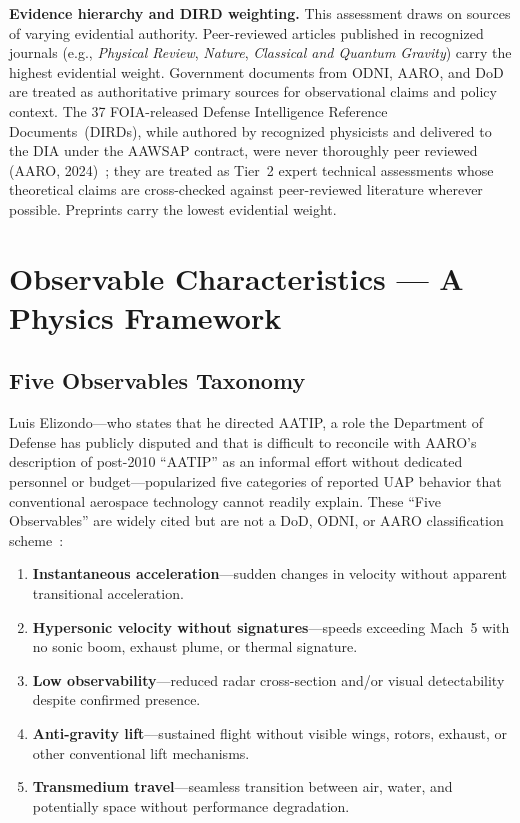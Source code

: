\documentclass[aps,prd,twocolumn,superscriptaddress,nofootinbib,floatfix]{revtex4-2}
\begin{document}
\textbf{Evidence hierarchy and DIRD weighting.} This assessment draws on sources
of varying evidential authority. Peer-reviewed articles published in recognized
journals (e.g., \textit{Physical Review}, \textit{Nature}, \textit{Classical and
Quantum Gravity}) carry the highest evidential weight. Government documents from
ODNI, AARO, and DoD are treated as authoritative primary sources for observational
claims and policy context. The 37 FOIA-released Defense Intelligence Reference
Documents~(DIRDs), while authored by recognized physicists and delivered to the
DIA under the AAWSAP contract, were never thoroughly peer reviewed (AARO,
2024)~\cite{AARO2024}; they are treated as Tier~2 expert technical assessments
whose theoretical claims are cross-checked against peer-reviewed literature
wherever possible. Preprints carry the lowest evidential weight.

\section{Observable Characteristics --- A Physics Framework}\label{sec:observables}

\subsection{Five Observables Taxonomy}\label{sec:five-observables}

Luis Elizondo---who states that he directed AATIP, a role the Department of
Defense has publicly disputed and that is difficult to reconcile with AARO's
description of post-2010 ``AATIP'' as an informal effort without dedicated
personnel or budget---popularized five categories of reported UAP behavior that
conventional aerospace technology cannot readily explain. These ``Five
Observables'' are widely cited but are not a DoD, ODNI, or AARO classification
scheme~\cite{Elizondo2024}:

\begin{enumerate}
  \item \textbf{Instantaneous acceleration}---sudden changes in velocity without
        apparent transitional acceleration.
  \item \textbf{Hypersonic velocity without signatures}---speeds exceeding
        Mach~5 with no sonic boom, exhaust plume, or thermal signature.
  \item \textbf{Low observability}---reduced radar cross-section and/or visual
        detectability despite confirmed presence.
  \item \textbf{Anti-gravity lift}---sustained flight without visible wings,
        rotors, exhaust, or other conventional lift mechanisms.
  \item \textbf{Transmedium travel}---seamless transition between air, water,
        and potentially space without performance degradation.
\end{enumerate}
\end{document}
